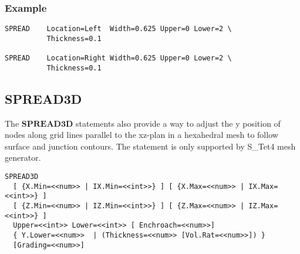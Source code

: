 \documentclass[oneside,12pt]{cgd_book}
\begin{document}
\subsubsection{Example}
\begin{lstlisting}[style=GeniusCode]
SPREAD    Location=Left  Width=0.625 Upper=0 Lower=2 \
          Thickness=0.1

SPREAD    Location=Right Width=0.625 Upper=0 Lower=2 \
          Thickness=0.1
\end{lstlisting}
\par
\subsection{SPREAD3D}
The $\mathbf{SPREAD3D}$
statements also provide a way to adjust the y position of nodes
        along grid lines parallel to the xz-plan in a hexahedral mesh to follow surface and junction contours. The
        statement is only supported by S\_Tet4 mesh generator.
\par
\begin{lstlisting}[style=GeniusCmd]
SPREAD3D
  [ {X.Min=<<num>> | IX.Min=<<int>>} ] [ {X.Max=<<num>> | IX.Max=<<int>>} ]
  [ {Z.Min=<<num>> | IZ.Min=<<int>>} ] [ {Z.Max=<<num>> | IZ.Max=<<int>>} ]
  Upper=<<int>> Lower=<<int>> [ Enchroach=<<num>>]
  { Y.Lower=<<num>>  | (Thickness=<<num>> [Vol.Rat=<<num>>]) }
  [Grading=<<num>>]
\end{lstlisting}
\par
\end{document}
